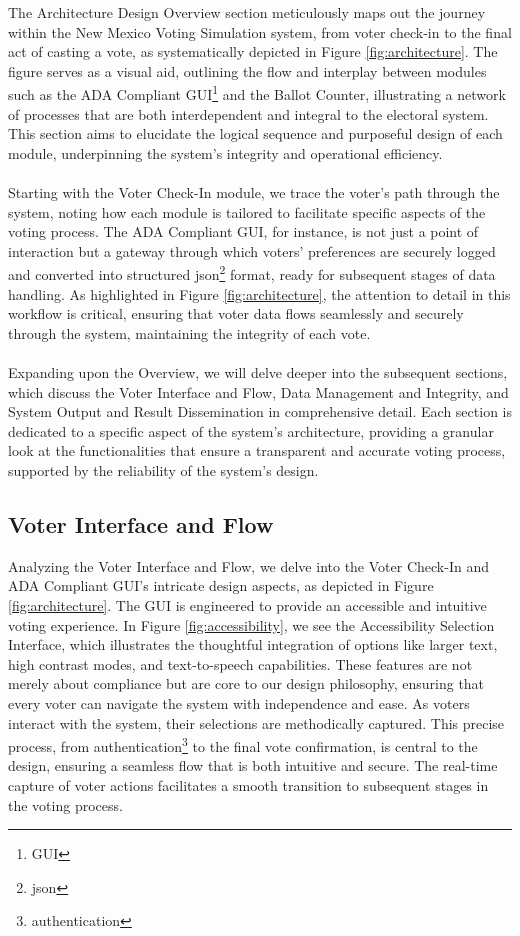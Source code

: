 \documentclass{article}
\begin{document}
The Architecture Design Overview section meticulously maps out the journey within the New Mexico Voting Simulation system, from voter check-in to the final act of casting a vote, as systematically depicted in Figure \ref{fig:architecture}. The figure serves as a visual aid, outlining the flow and interplay between modules such as the ADA Compliant \gls{GUI}\footnote{\glsdesc{GUI}} and the Ballot Counter, illustrating a network of processes that are both interdependent and integral to the electoral system. This section aims to elucidate the logical sequence and purposeful design of each module, underpinning the system’s integrity and operational efficiency. \\ \\
Starting with the Voter Check-In module, we trace the voter’s path through the system, noting how each module is tailored to facilitate specific aspects of the voting process. The ADA Compliant GUI, for instance, is not just a point of interaction but a gateway through which voters’ preferences are securely logged and converted into structured \gls{json}\footnote{\glsdesc{json}} format, ready for subsequent stages of data handling. As highlighted in Figure \ref{fig:architecture}, the attention to detail in this workflow is critical, ensuring that voter data flows seamlessly and securely through the system, maintaining the integrity of each vote. \\ \\
Expanding upon the Overview, we will delve deeper into the subsequent sections, which discuss the Voter Interface and Flow, Data Management and Integrity, and System Output and Result Dissemination in comprehensive detail. Each section is dedicated to a specific aspect of the system's architecture, providing a granular look at the functionalities that ensure a transparent and accurate voting process, supported by the reliability of the system’s design.

\clearpage

\subsection{Voter Interface and Flow}
Analyzing the Voter Interface and Flow, we delve into the Voter Check-In and ADA \cite{adaVotingPolling} Compliant GUI's intricate design aspects, as depicted in Figure \ref{fig:architecture}. The GUI is engineered to provide an accessible and intuitive voting experience. In Figure \ref{fig:accessibility}, we see the Accessibility Selection Interface, which illustrates the thoughtful integration of options like larger text, high contrast modes, and text-to-speech capabilities. These features are not merely about compliance but are core to our design philosophy, ensuring that every voter can navigate the system with independence and ease. As voters interact with the system, their selections are methodically captured. This precise process, from \gls{authentication}\footnote{\glsdesc{authentication}} to the final vote confirmation, is central to the design, ensuring a seamless flow that is both intuitive and secure. The real-time capture of voter actions facilitates a smooth transition to subsequent stages in the voting process.
\end{document}
